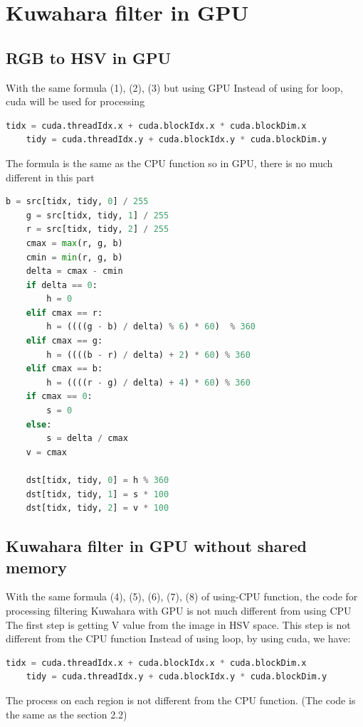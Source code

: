 \documentclass{article}
\begin{document}
\section{Kuwahara filter in GPU}

\subsection{RGB to HSV in GPU}
With the same formula (1), (2), (3) but using GPU
Instead of using for loop, cuda will be used for processing 

    \begin{lstlisting}[language=Python]
    tidx = cuda.threadIdx.x + cuda.blockIdx.x * cuda.blockDim.x
    tidy = cuda.threadIdx.y + cuda.blockIdx.y * cuda.blockDim.y
    \end{lstlisting}
The formula is the same as the CPU function so in GPU, there is no much different in this part

    \begin{lstlisting}[language=Python]
    b = src[tidx, tidy, 0] / 255
    g = src[tidx, tidy, 1] / 255
    r = src[tidx, tidy, 2] / 255
    cmax = max(r, g, b)
    cmin = min(r, g, b)
    delta = cmax - cmin
    if delta == 0:
        h = 0
    elif cmax == r:
        h = ((((g - b) / delta) % 6) * 60)  % 360
    elif cmax == g:
        h = ((((b - r) / delta) + 2) * 60) % 360
    elif cmax == b:
        h = ((((r - g) / delta) + 4) * 60) % 360
    if cmax == 0:
        s = 0
    else:
        s = delta / cmax
    v = cmax

    dst[tidx, tidy, 0] = h % 360
    dst[tidx, tidy, 1] = s * 100
    dst[tidx, tidy, 2] = v * 100
    \end{lstlisting}

\subsection{Kuwahara filter in GPU without shared memory}
With the same formula (4), (5), (6), (7), (8) of using-CPU function, the code for processing filtering Kuwahara with GPU is not much different from using CPU
The first step is getting V value from the image in HSV space. This step is not different from the CPU function
Instead of using loop, by using cuda, we have:
    \begin{lstlisting}[language=Python]
    tidx = cuda.threadIdx.x + cuda.blockIdx.x * cuda.blockDim.x
    tidy = cuda.threadIdx.y + cuda.blockIdx.y * cuda.blockDim.y
    \end{lstlisting}
The process on each region is not different from the CPU function. (The code is the same as the section 2.2)
\end{document}
